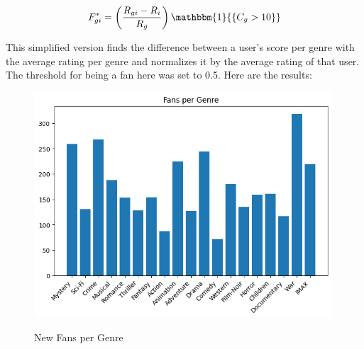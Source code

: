 \documentclass[12pt]{article}
\numberwithin{equation}{section}
\begin{document}
\[
F_{gi}^* = \left(\frac{R_{gi} - R_i}{R_g}\right)\mathbbm{1}{\{C_g > 10\}}
\]

This simplified version finds the difference between a user's score per genre with the average rating per genre and normalizes it by the average rating of that user. The threshold for being a fan here was set to 0.5. Here are the results:
\begin{figure}[h!]
\centering
    \begin{minipage}[b]{0.5\linewidth}
         \centering
  	\includegraphics[width=0.99\textwidth]{fansgenre1.png}
  	\label{fig:fanspergenre}
	 \caption{New Fans per Genre}
    \end{minipage} 
\end{figure}
\end{document}

